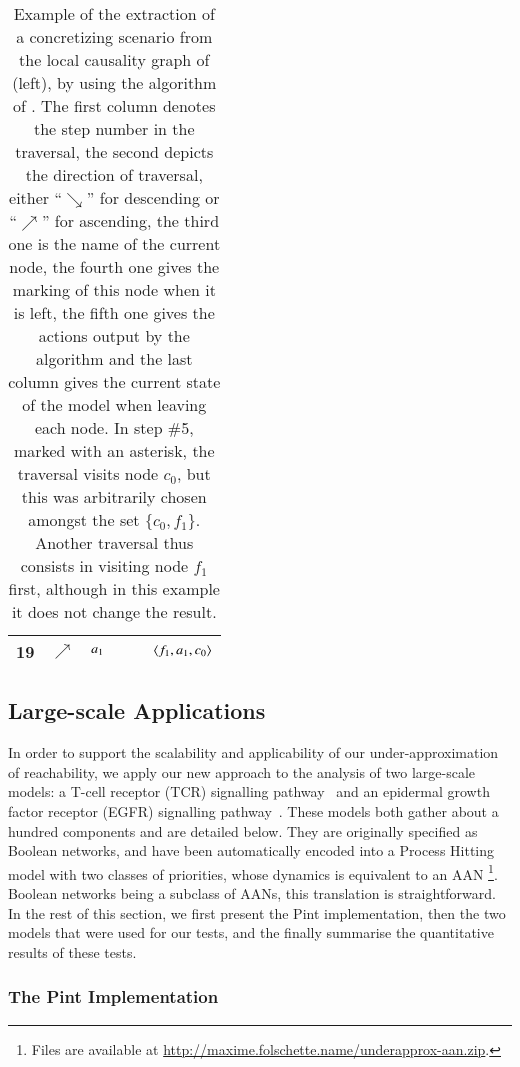 \begin{table}[p]
\begin{tabular}{|c|c|c|l|l|l|}
    19 & $\nearrow$ & $a_1$ &  &  & $\mbox{$\langle f_1, a_1, c_0 \rangle$}$ \\\hline
  \end{tabular}
  \caption{\label{tab:concret-metazoan}%
    Example of the extraction of a concretizing scenario
    from the local causality graph of (left),
    by using the algorithm of .
    The first column denotes the step number in the traversal,
    the second depicts the direction of traversal,
    either “$\searrow$” for descending or “$\nearrow$” for ascending,
    the third one is the name of the current node,
    the fourth one gives the marking of this node when it is left,
    the fifth one gives the actions output by the algorithm
    and the last column gives the current state of the model when leaving each node.
    In step \#5, marked with an asterisk,
    the traversal visits node $c_0$, but this was arbitrarily chosen
    amongst the set $\{ c_0, f_1 \}$.
    Another traversal thus consists in visiting node $f_1$ first,
    although in this example it does not change the result.
  }
\end{table}



\subsection{Large-scale Applications}
\label{ssec:ex-tcrsig}

In order to support the scalability and applicability of our under-approximation of reachability, we
apply our new approach to the analysis of two large-scale models:
a T-cell receptor (TCR) signalling pathway~\cite{tcrsig94}
and an epidermal growth factor receptor (EGFR) signalling pathway~\cite{Samaga2009}.
These models both gather about a hundred components and are detailed below.
They are originally specified as Boolean networks,
and have been automatically encoded into
a Process Hitting model with two classes of priorities,
whose dynamics is equivalent to an AAN%
\footnote{Files are available at
\url{http://maxime.folschette.name/underapprox-aan.zip}.}.
Boolean networks being a subclass of AANs, this translation is straightforward.
In the rest of this section, we first present the Pint implementation,
then the two models that were used for our tests,
and the finally summarise the quantitative results of these tests.

\subsubsection*{The Pint Implementation}


